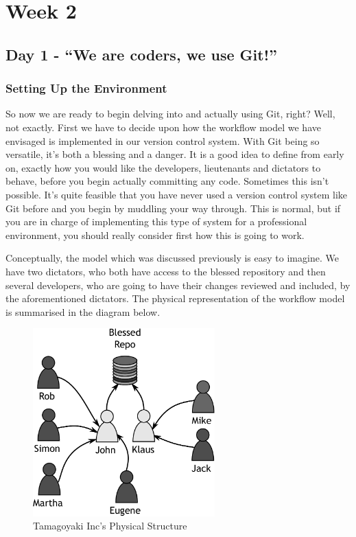 \chapter{Week 2}
\section{Day 1 - ``We are coders, we use Git!''}
\subsection{Setting Up the Environment}

So now we are ready to begin delving into and actually using Git, right? Well, not exactly.
First we have to decide upon how the workflow model we have envisaged is implemented in our version control system.
With Git being so versatile, it's both a blessing and a danger.
It is a good idea to define from early on, exactly how you would like the developers, lieutenants and dictators to behave, before you begin actually committing any code.
Sometimes this isn't possible.
It's quite feasible that you have never used a version control system like Git before and you begin by muddling your way through.
This is normal, but if you are in charge of implementing this type of system for a professional environment, you should really consider first how this is going to work.

Conceptually, the model which was discussed previously is easy to imagine.
We have two dictators, who both have access to the blessed repository and then several developers, who are going to have their changes reviewed and included, by the aforementioned dictators.
The physical representation of the workflow model is summarised in the diagram below.

\begin{figure}[bt]
\centering
\includegraphics[width=7cm]{images/f-w2-d1.pdf}
\caption{Tamagoyaki Inc's Physical Structure}
\end{figure}

